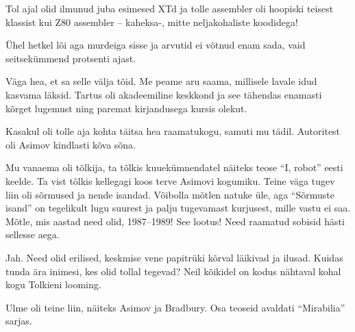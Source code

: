 Tol ajal olid ilmunud juba esimesed XTd ja tolle 
assembler oli hoopiski teisest klassist kui Z80 assembler -- kaheksa-, mitte neljakohaliste koodidega! 

Ühel hetkel lõi aga murdeiga sisse ja arvutid ei võtnud enam sada, vaid seitsekümmend protsenti ajast. 


Väga hea, et sa selle välja tõid. Me peame aru saama, millisele lavale 
idud kasvama läksid. Tartus oli akadeemiline keskkond ja see tähendas 
enamasti kõrget lugemust ning paremat kirjandusega kursis olekut.

Kasakul oli tolle aja kohta täitsa hea raamatukogu, 
samuti mu tädil. Autoritest oli Asimov
kindlasti kõva sõna. 

Mu vanaema oli tõlkija, ta tõlkis kuuekümnendatel näiteks teose \enquote{I, 
robot} eesti keelde. Ta vist tõlkis kellegagi koos terve Asimovi 
kogumiku. Teine väga tugev liin oli sõrmused ja nende 
isandad. 
Võibolla mõtlen natuke üle, aga \enquote{Sõrmuste isand} on tegelikult lugu suurest ja palju tugevamast kurjusest, mille 
vastu ei saa. Mõtle, mis aastad need olid, 1987--1989! See lootus! Need 
raamatud sobisid hästi sellesse aega.


Jah. Need olid erilised, keskmise vene papitrüki kõrval läikivad ja ilusad. Kuidas tunda ära 
inimesi, kes olid tollal tegevad? Neil kõikidel on kodus nähtaval kohal kogu Tolkieni looming.

Ulme oli teine liin, näiteks Asimov ja Bradbury. Osa teoseid avaldati \enquote{Mirabilia} sarjas. 


